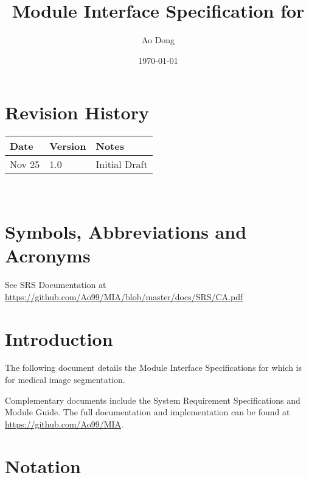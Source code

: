 \documentclass[12pt, titlepage]{article}
\begin{document}
\title{Module Interface Specification for \progname}

\author{Ao Dong}

\date{\today}

\maketitle


\section{Revision History}

\begin{tabularx}{\textwidth}{p{3cm}p{2cm}X}
\toprule {\bf Date} & {\bf Version} & {\bf Notes}\\
\midrule
Nov 25 & 1.0 & Initial Draft\\
\bottomrule
\end{tabularx}

~\newpage

\section{Symbols, Abbreviations and Acronyms}

See SRS Documentation at
\url{https://github.com/Ao99/MIA/blob/master/docs/SRS/CA.pdf}

\newpage

\tableofcontents

\newpage


\section{Introduction}

The following document details the Module Interface Specifications for
\progname{} which is for medical image segmentation.

Complementary documents include the System Requirement Specifications
and Module Guide.  The full documentation and implementation can be
found at \url{https://github.com/Ao99/MIA}.

\section{Notation}
\end{document}
